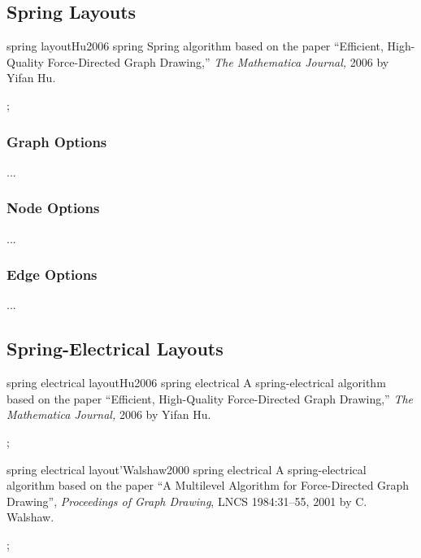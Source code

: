 \subsection{Spring Layouts}


\begin{gdalgorithm}{spring layout}{Hu2006 spring}
  Spring algorithm based on the paper ``Efficient, High-Quality
    Force-Directed Graph Drawing,'' \emph{The Mathematica Journal,}
    2006 by Yifan Hu. 
\begin{codeexample}[]
\tikz {};    
\end{codeexample}
\end{gdalgorithm}

\subsubsection{Graph Options}

...

\subsubsection{Node Options}

...

\subsubsection{Edge Options}

...



\subsection{Spring-Electrical Layouts}


\begin{gdalgorithm}{spring electrical layout}{Hu2006 spring electrical}
  A spring-electrical algorithm based on the paper ``Efficient, High-Quality
    Force-Directed Graph Drawing,'' \emph{The Mathematica Journal,}
    2006 by Yifan Hu. 
\begin{codeexample}[]
\tikz {};    
\end{codeexample}
\end{gdalgorithm}

\begin{gdalgorithm}{spring electrical layout'}{Walshaw2000 spring electrical}
  A spring-electrical algorithm based on the paper ``A Multilevel
  Algorithm for Force-Directed Graph Drawing'', \emph{Proceedings of
    Graph Drawing}, LNCS 1984:31--55, 2001 by C. Walshaw.
\begin{codeexample}[]
\tikz {};    
\end{codeexample}
\end{gdalgorithm}


